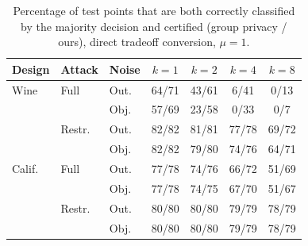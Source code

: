 \begin{table}[t]
\centering
\caption{Percentage of test points that are both correctly classified by the majority decision and certified (group privacy / ours), direct tradeoff conversion, $\mu=1$.}
\label{tab:downstream-correct}
\footnotesize
\setlength{\tabcolsep}{3pt}
\begin{tabular}{lllcccc}
\toprule
Design & Attack & Noise & $k=1$ & $k=2$ & $k=4$ & $k=8$ \\
\midrule
Wine & Full & Out. & 64/71 & 43/61 & 6/41 & 0/13 \\
 &  & Obj. & 57/69 & 23/58 & 0/33 & 0/7 \\
 & Restr. & Out. & 82/82 & 81/81 & 77/78 & 69/72 \\
 &  & Obj. & 82/82 & 79/80 & 74/76 & 64/71 \\
\midrule
Calif. & Full & Out. & 77/78 & 74/76 & 66/72 & 51/69 \\
 &  & Obj. & 77/78 & 74/75 & 67/70 & 51/67 \\
 & Restr. & Out. & 80/80 & 80/80 & 79/79 & 78/79 \\
 &  & Obj. & 80/80 & 80/80 & 79/79 & 78/79 \\
\bottomrule
\end{tabular}
\end{table}
